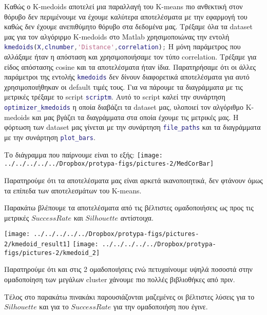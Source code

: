 Καθώς ο K-medoids αποτελεί μια παραλλαγή του K-means πιο ανθεκτική στον θόρυβο δεν περιμένουμε να έχουμε καλύτερα αποτελέσματα με την εφαρμογή του καθώς δεν έχουμε ανεπιθύμητο θόρυβο στα δεδομένα μας. Τρέξαμε όλα τα dataset μας για τον αλγόριρμο K-medoids στο Matlab χρησιμοποιώνας την εντολή \lstinline[language=MATLAB]!kmedoids(X,clnumber,'Distance',correlation);!
Η μόνη παράμετρος που αλλάξαμε ήταν η απόσταση και χρησιμοποιήσαμε τον τύπο correlation. Τρέξαμε για είδος απόστασης cosine και τα αποτελέσματα ήταν ίδια. Παρατηρήσαμε ότι οι άλλες παράμετροι της εντολής \lstinline[language=MATLAB]!kmedoids! δεν δίνουν διαφορετικά αποτελέσματα για αυτό χρησιμοποιήθηκαν οι default τιμές τους. Για να πάρουμε τα διαγράμματα με τις μετρικές τρέξαμε το script  \lstinline[language=MATLAB]!scriptm!. Αυτό το script καλεί την συνάρτηση \lstinline[language=MATLAB]!optimizer_kmedoids! η οποία διαβάζει τα dataset μας, υλοποιεί τον αλγόριθμο K-medoids και μας βγάζει τα διαγράμματα στα οποία έχουμε τις μετρικές μας. Η φόρτωση των dataset μας γίνεται με την συνάρτηση \lstinline[language=MATLAB]!file_paths! και τα διαγράμματα με την συνάρτηση \lstinline[language=MATLAB]!plot_bars!.

Το διάγραμμα που παίρνουμε είναι το εξής:
\texttt{[image: ../../../../../Dropbox/protypa-figs/pictures-2/MedCorBar]}

Παρατηρούμε ότι τα αποτελέσματα μας είναι αρκετά ικανοποιητικά, δεν φτάνουν όμως τα επίπεδα των αποτελεσμάτων του K-means.

Παρακάτω βλέπουμε τα αποτελέσματα από τις βέλτιστες ομαδοποιήσεις ως προς τις μετρικές $SuccessRate$ και $Silhouette$ αντίστοιχα.
\noindent\begin{minipage}{\linewidth}
	\centering
\texttt{[image: ../../../../../Dropbox/protypa-figs/pictures-2/kmedoid\_result1]}
\texttt{[image: ../../../../../Dropbox/protypa-figs/pictures-2/kmedoid\_2]}
	\label{fig:kmeans8_result}
\end{minipage}

Παρατηρούμε ότι και στις 2 ομαδοποιήσεις ενώ πετυχαίνουμε υψηλά ποσοστά στην ομαδοποίηση των μεγάλων cluster χάνουμε πιο πολλές βιβλιοθήκες από πριν.

Τέλος στο παρακάτω πινακάκι παρουσιάζονται μαζεμένες οι βέλτιστες λύσεις για το $Silhouette$ και για το $Success Rate$ για την ομαδοποιήση που έγινε.
\begin{table}[]
	\centering
	\caption{K-medoids Best Results}
	\label{my-label}
\end{table}